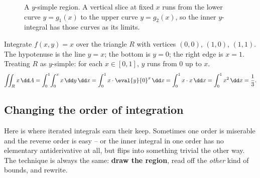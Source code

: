 \begin{figure}[H]
\centering
{}
\caption{A $y$-simple region. A vertical slice at fixed $x$ runs from the lower
curve $y=g_1(x)$ to the upper curve $y=g_2(x)$, so the inner $y$-integral has
those curves as its limits.}
\label{ch34:fig-ysimple}
\end{figure}

\begin{example}
\label{ch34:ex-tri}
Integrate $f(x,y)=x$ over the triangle $R$ with vertices $(0,0)$, $(1,0)$,
$(1,1)$. The hypotenuse is the line $y=x$; the bottom is $y=0$; the right edge is
$x=1$. Treating $R$ as $y$-simple: for each $x\in[0,1]$, $y$ runs from $0$ up to
$x$.
\[
  \iint_R x\,\dd A=\int_0^1\!\int_0^x x\,\dd y\,\dd x
  =\int_0^1 x\cdot\eval{y}{0}^{x}\,\dd x
  =\int_0^1 x\cdot x\,\dd x
  =\int_0^1 x^2\,\dd x=\frac13 .
\]
\end{example}

\subsection{Changing the order of integration}

Here is where iterated integrals earn their keep. Sometimes one order is
miserable and the reverse order is easy -- or the inner integral in one order has
no elementary antiderivative at all, but flips into something trivial the other
way. The technique is always the same: \textbf{draw the region}, read off the
\emph{other} kind of bounds, and rewrite.

